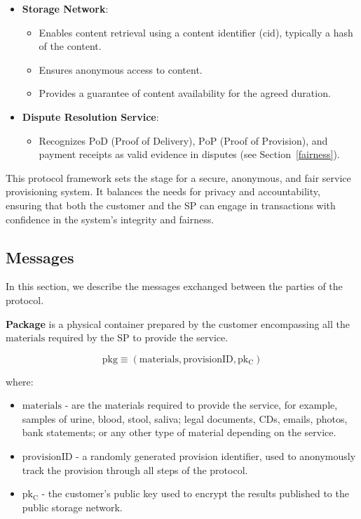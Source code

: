 \documentclass[pdftex,twocolumn,epjc3]{svjour3}
\begin{document}
{\begin{itemize}
\item \textbf{Storage Network}:
    \begin{itemize}
        \item Enables content retrieval using a content identifier ($\mathrm{cid}$), typically a hash of the content.
        \item Ensures anonymous access to content.
        \item Provides a guarantee of content availability for the agreed duration.
    \end{itemize}
    
\item \textbf{Dispute Resolution Service}:
    \begin{itemize}
        \item Recognizes $\mathrm{PoD}$ (Proof of Delivery), $\mathrm{PoP}$ (Proof of Provision), and payment receipts as valid evidence in disputes (see Section~\ref{fairness}).
    \end{itemize}
\end{itemize}


This protocol framework sets the stage for a secure, anonymous, and fair service provisioning system. It balances the needs for privacy and accountability, ensuring that both the customer and the SP can engage in transactions with confidence in the system's integrity and fairness.

\subsection{Messages}\label{messages}
In this section, we describe the messages exchanged between the parties of the protocol.

\vspace{5mm}

\noindent \textbf
{Package}\label{package} is a physical container prepared by the customer encompassing all the $\mathrm{materials}$ required by the SP to provide the service.

$$\mathrm{pkg} \equiv (\mathrm{materials}, \mathrm{provisionID}, \mathrm{pk_C})$$

where:

\begin{itemize}

\item $\mathrm{materials}$ - are the materials required to provide the service, for example, samples of urine, blood, stool, saliva; legal documents, CDs, emails, photos, bank statements; or any other type of material depending on the service.
\item $\mathrm{provisionID}$ - a randomly generated provision identifier, used to anonymously track the provision through all steps of the protocol.
\item $\mathrm{pk_C}$ - the customer's public key used to encrypt the results published to the public storage network.
\end{itemize}

}
\end{document}
